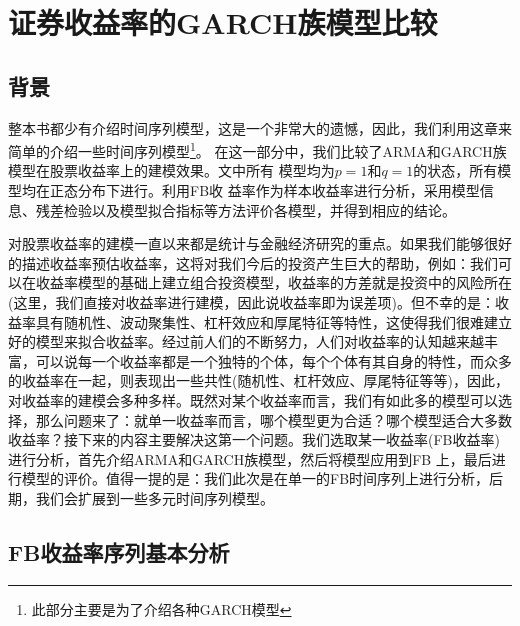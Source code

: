 
\chapter{证券收益率的GARCH族模型比较}

\section{背景}
    \par
    整本书都少有介绍时间序列模型，这是一个非常大的遗憾，因此，我们利用这章来简单的介绍一些时间序列模型\footnote{此部分主要是为了介绍各种GARCH模型}。
    在这一部分中，我们比较了ARMA和GARCH族模型在股票收益率上的建模效果。文中所有
    模型均为$p=1$和$q=1$的状态，所有模型均在正态分布下进行。利用FB收
    益率作为样本收益率进行分析，采用模型信息、残差检验以及模型拟合指标等方法评价各模型，并得到相应的结论。
    \par
    对股票收益率的建模一直以来都是统计与金融经济研究的重点。如果我们能够很好的描述收益率预估收益率，这将对我们今后的投资产生巨大的帮助，例如：我们可以在收益率模型的基础上建立组合投资模型，收益率的方差就是投资中的风险所在(这里，我们直接对收益率进行建模，因此说收益率即为误差项)。但不幸的是：收益率具有随机性、波动聚集性、杠杆效应和厚尾特征等特性，这使得我们很难建立好的模型来拟合收益率。经过前人们的不断努力，人们对收益率的认知越来越丰富，可以说每一个收益率都是一个独特的个体，每个个体有其自身的特性，而众多的收益率在一起，则表现出一些共性(随机性、杠杆效应、厚尾特征等等)，因此，对收益率的建模会多种多样。既然对某个收益率而言，我们有如此多的模型可以选择，那么问题来了：就单一收益率而言，哪个模型更为合适？哪个模型适合大多数收益率？接下来的内容主要解决这第一个问题。我们选取某一收益率(FB收益率)进行分析，首先介绍ARMA和GARCH族模型，然后将模型应用到FB 上，最后进行模型的评价。值得一提的是：我们此次是在单一的FB时间序列上进行分析，后期，我们会扩展到一些多元时间序列模型。
\section{FB收益率序列基本分析}

